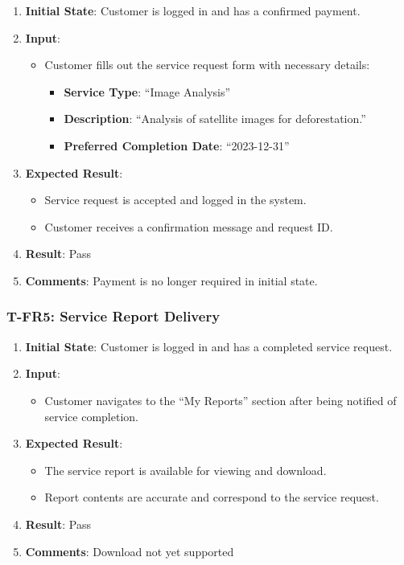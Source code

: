 \documentclass[12pt, titlepage]{article}
\begin{document}
\begin{enumerate}

    \item \textbf{Initial State}: Customer is logged in and has a confirmed payment.
    \item \textbf{Input}:
    \begin{itemize}
        \item Customer fills out the service request form with necessary details:
        \begin{itemize}
            \item \textbf{Service Type}: ``Image Analysis''
            \item \textbf{Description}: ``Analysis of satellite images for deforestation.''
            \item \textbf{Preferred Completion Date}: ``2023-12-31''
        \end{itemize}
    \end{itemize}

        \item \textbf{Expected Result}:
        \begin{itemize}
            \item Service request is accepted and logged in the system.
            \item Customer receives a confirmation message and request ID.
        \end{itemize}
        \item \textbf{Result}: Pass
        \item \textbf{Comments}: Payment is no longer required in initial state.
\end{enumerate}

\subsubsection*{T-FR5: Service Report Delivery}

\begin{enumerate}
    
    \item \textbf{Initial State}: Customer is logged in and has a completed service request.
    \item \textbf{Input}:
    \begin{itemize}
        \item Customer navigates to the ``My Reports'' section after being notified of service completion.
    \end{itemize}
    
        \item \textbf{Expected Result}:
        \begin{itemize}
            \item The service report is available for viewing and download.
            \item Report contents are accurate and correspond to the service request.
        \end{itemize}
        \item \textbf{Result}: Pass
        \item \textbf{Comments}: Download not yet supported
\end{enumerate}
\end{document}
